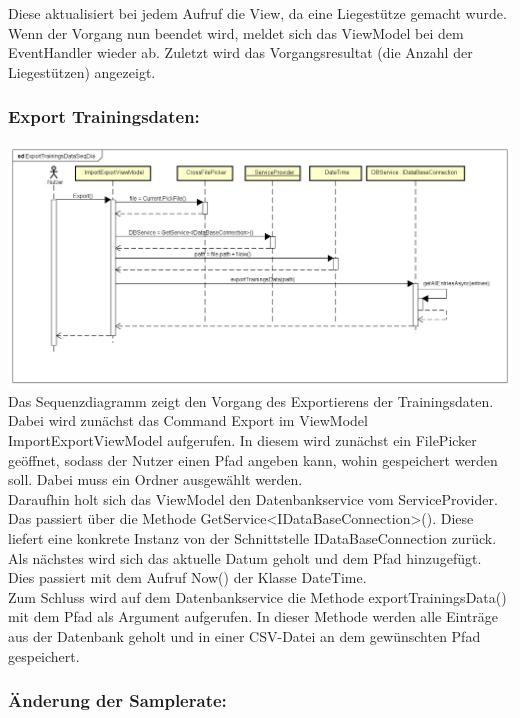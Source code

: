 \documentclass[a4paper,12pt]{article}
\begin{document}
Diese aktualisiert bei jedem Aufruf die View, da eine Liegestütze gemacht wurde.\\
Wenn der Vorgang nun beendet wird, meldet sich das ViewModel bei dem EventHandler wieder ab. Zuletzt wird das Vorgangsresultat (die Anzahl der Liegestützen) angezeigt.\\ 


\subsubsection{Export Trainingsdaten:}
\includegraphics[width=1.1\textwidth]{./Diagramme/TrainingDatenExportSeqDig.png}\\

Das Sequenzdiagramm zeigt den Vorgang des Exportierens der Trainingsdaten. 
Dabei wird zunächst das Command Export im ViewModel ImportExportViewModel aufgerufen. In diesem wird zunächst ein FilePicker geöffnet, sodass der Nutzer einen Pfad angeben kann, wohin gespeichert werden soll. 
Dabei muss ein Ordner ausgewählt werden. \\
Daraufhin holt sich das ViewModel den Datenbankservice vom ServiceProvider. Das passiert über die Methode GetService<IDataBaseConnection>(). Diese liefert eine konkrete Instanz von der Schnittstelle IDataBaseConnection zurück.
Als nächstes wird sich das aktuelle Datum geholt und dem Pfad hinzugefügt. Dies passiert mit dem Aufruf Now() der Klasse DateTime.\\
Zum Schluss wird auf dem Datenbankservice die Methode exportTrainingsData() mit dem Pfad als Argument aufgerufen. In dieser Methode werden alle Einträge aus der Datenbank geholt und in einer \gls{CSV}-Datei an dem gewünschten Pfad gespeichert.\\

\subsubsection{Änderung der Samplerate:}
\end{document}
